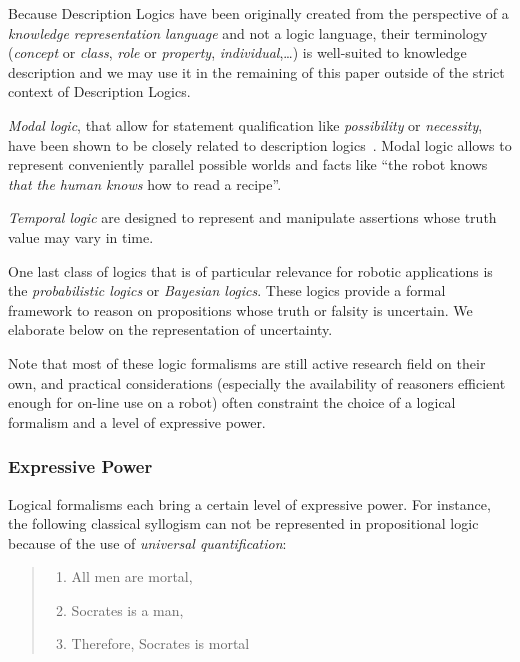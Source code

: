 Because Description Logics have been originally created from the perspective of
a \emph{knowledge representation language} and not a logic language, their
terminology (\emph{concept} or \emph{class}, \emph{role} or \emph{property},
\emph{individual},\ldots) is well-suited to knowledge description and we may use
it in the remaining of this paper outside of the strict context of  Description
Logics.

\emph{Modal logic}, that allow for statement qualification like
\emph{possibility} or \emph{necessity}, have been shown to be closely related
to description logics~\cite{Baader2001}. Modal logic allows to represent conveniently parallel
possible worlds and facts like ``the robot knows \emph{that the human knows}
how to read a recipe''.


\emph{Temporal logic} are designed to represent and manipulate assertions whose
truth value may vary in time.

One last class of logics that is of particular relevance for robotic
applications is the \emph{probabilistic logics} or \emph{Bayesian logics}.
These logics provide a formal framework to reason on propositions whose truth
or falsity is uncertain. We elaborate below on the representation of uncertainty.

Note that most of these logic formalisms are still active research field on
their own, and practical considerations (especially the availability of
reasoners efficient enough for on-line use on a robot) often constraint the
choice of a logical formalism and a level of expressive power.

\subsubsection{Expressive Power}

Logical formalisms each bring a certain level of expressive power. For
instance, the following classical syllogism can not be represented in
propositional logic because of the use of \emph{universal quantification}:

\begin{quote}
\begin{enumerate}
    \item All men are mortal,
    \item Socrates is a man,
    \item Therefore, Socrates is mortal
\end{enumerate}
\end{quote}

